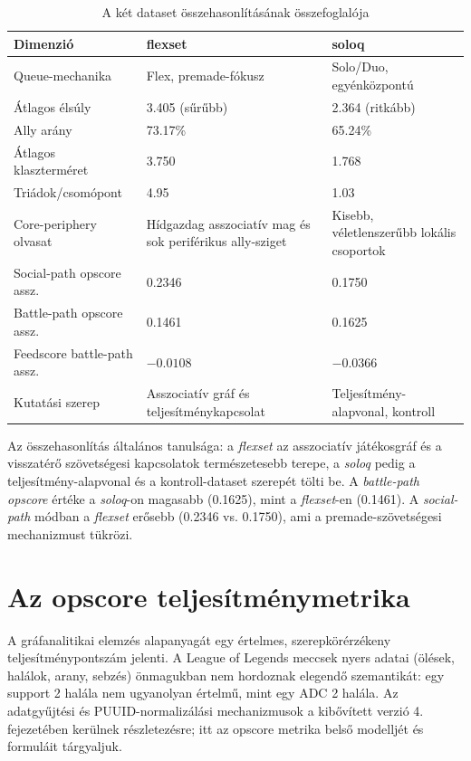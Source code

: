 \begin{table}[H]
\centering
\caption{A két dataset összehasonlításának összefoglalója}
\begin{tabularx}{\textwidth}{>{\raggedright\arraybackslash}p{5cm} X X}
\toprule
\textbf{Dimenzió} & \textbf{flexset} & \textbf{soloq} \\
\midrule
Queue-mechanika & Flex, premade-fókusz & Solo/Duo, egyénközpontú \\
Átlagos élsúly & 3.405 (sűrűbb) & 2.364 (ritkább) \\
Ally arány & 73.17\% & 65.24\% \\
Átlagos klaszterméret & 3.750 & 1.768 \\
Triádok/csomópont & 4.95 & 1.03 \\
Core-periphery olvasat & Hídgazdag asszociatív mag és sok periférikus ally-sziget & Kisebb, véletlenszerűbb lokális csoportok \\
Social-path opscore assz. & 0.2346 & 0.1750 \\
Battle-path opscore assz. & 0.1461 & 0.1625 \\
Feedscore battle-path assz. & $-0.0108$ & $-0.0366$ \\
Kutatási szerep & Asszociatív gráf és teljesítménykapcsolat & Teljesítmény-alapvonal, kontroll \\
\bottomrule
\end{tabularx}
\end{table}

Az összehasonlítás általános tanulsága: a \textit{flexset} az asszociatív játékosgráf és a visszatérő szövetségesi kapcsolatok természetesebb terepe, a \textit{soloq} pedig a teljesítmény-alapvonal és a kontroll-dataset szerepét tölti be. A \textit{battle-path opscore} értéke a \textit{soloq}-on magasabb (0.1625), mint a \textit{flexset}-en (0.1461). A \textit{social-path} módban a \textit{flexset} erősebb (0.2346 vs. 0.1750), ami a premade-szövetségesi mechanizmust tükrözi.

\chapter{Az opscore teljesítménymetrika}

\noindent A gráfanalitikai elemzés alapanyagát egy értelmes, szerepkörérzékeny teljesítménypontszám jelenti. A League of Legends meccsek nyers adatai (ölések, halálok, arany, sebzés) önmagukban nem hordoznak elegendő szemantikát: egy support 2 halála nem ugyanolyan értelmű, mint egy ADC 2 halála. Az adatgyűjtési és PUUID-normalizálási mechanizmusok a kibővített verzió 4. fejezetében kerülnek részletezésre; itt az opscore metrika belső modelljét és formuláit tárgyaljuk.

